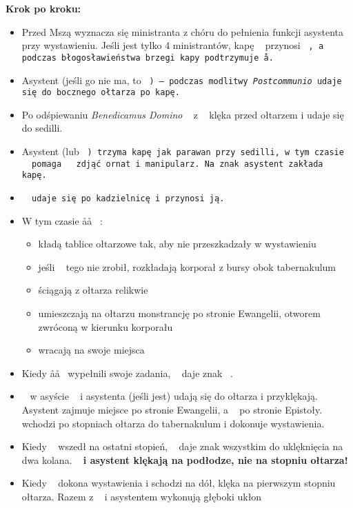 \textbf{Krok po kroku:}
\begin{itemize}
	\item Przed Mszą wyznacza się ministranta z chóru do pełnienia funkcji
	      asystenta przy wystawieniu. Jeśli jest tylko 4 ministrantów, kapę \ii~
	      przynosi \tt~, a podczas błogosławieństwa brzegi kapy podtrzymuje \aa.
	\item Asystent (jeśli go nie ma, to \tt~) – podczas modlitwy
	      \textit{Postcommunio} udaje się do bocznego ołtarza po kapę.
	\item Po odśpiewaniu \textit{Benedicamus Domino} \ii~ z \cc~ klęka przed
	      ołtarzem i udaje się do sedilli.
	\item Asystent (lub \tt~) trzyma kapę jak parawan przy sedilli, w tym czasie
	      \cc~ pomaga \ii~ zdjąć ornat i manipularz. Na znak \cc asystent
	      zakłada \ii~ kapę.
	\item \tt~ udaje się po kadzielnicę i przynosi ją.
	\item W tym czasie \aa\aa~ :
	      \begin{itemize}
		      \item kładą tablice ołtarzowe tak, aby nie przeszkadzały w
		            wystawieniu
		      \item jeśli \ii~ tego nie zrobił, rozkładają korporał z bursy obok
		            tabernakulum
		      \item ściągają z ołtarza relikwie
		      \item umieszczają na ołtarzu monstrancję po stronie Ewangelii,
		            otworem zwróconą w kierunku korporału
		      \item wracają na swoje miejsca
	      \end{itemize}
	\item Kiedy \aa\aa~ wypełnili swoje zadania, \cc~ daje znak \ii~.
	\item \ii~ w asyście \cc~ i asystenta (jeśli jest) udają się do ołtarza i
	      przyklękają. Asystent zajmuje miejsce po stronie Ewangelii, a \cc~ po
	      stronie Epistoły. \ii~ wchodzi po stopniach ołtarza do tabernakulum i
	      dokonuje wystawienia.
	\item Kiedy \ii~ wszedł na ostatni stopień, \cc~ daje znak wszystkim do
	      uklęknięcia na dwa kolana. {\boldmath{\cc}}~\textbf{ i asystent
		      klękają na podłodze, nie na stopniu ołtarza!}
	\item  Kiedy \ii~ dokona wystawienia i schodzi na dół, klęka na pierwszym
	      stopniu ołtarza. Razem z \cc~ i asystentem wykonują głęboki ukłon

\end{itemize}
